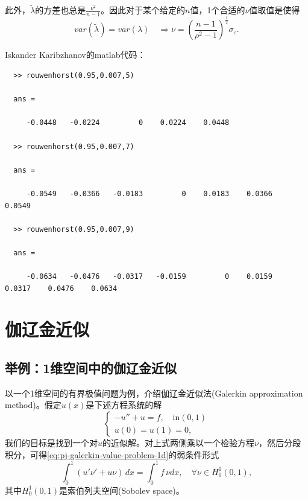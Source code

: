 \begin{subappendices}
此外，$\tilde{\lambda}$的方差也总是$\frac{\nu^2}{n-1}$。因此对于某个给定的$n$值，1个合适的$\nu$值取值是使得\begin{equation*}
var \left( \tilde{\lambda} \right) = var \left( \lambda \right) \quad \Rightarrow \nu = \left( \frac{n-1}{\rho^2 - 1} \right)^{\frac{1}{2}} \sigma_{\varepsilon}.
\end{equation*}

Iskander Karibzhanov的matlab代码：

\begin{verbatim}
  >> rouwenhorst(0.95,0.007,5)

  ans =

     -0.0448   -0.0224         0    0.0224    0.0448

  >> rouwenhorst(0.95,0.007,7)

  ans =

     -0.0549   -0.0366   -0.0183         0    0.0183    0.0366    0.0549

  >> rouwenhorst(0.95,0.007,9)

  ans =

     -0.0634   -0.0476   -0.0317   -0.0159         0    0.0159    0.0317    0.0476    0.0634
\end{verbatim}


\section{伽辽金近似}
\label{sec:pj-galerkin-approximation}

\subsection{举例：1维空间中的伽辽金近似}
\label{sec:pj-galerkin-1d-example}
以一个1维空间的有界极值问题为例，介绍伽辽金近似法(Galerkin approximation method)。假定$u(x)$是下述方程系统的解
\begin{equation}
  \label{eq:pj-galerkin-value-problem-1d}
  \begin{cases}
    -u'' + u = f, \quad \text{in} (0,1) \\
    u(0)=u(1)=0,
  \end{cases}
\end{equation}
我们的目标是找到一个对$u$的近似解。对上式两侧乘以一个检验方程$\nu$，然后分段积分，可得\eqref{eq:pj-galerkin-value-problem-1d}的弱条件形式
\begin{equation}
  \label{eq:pj-galerkin-value-problem-integral}
  \int_{0}^{1} \left( u' \nu' + u \nu \right) \, dx = \int_{0}^{1} f \, \nu dx, \quad \forall \nu \in H_{0}^1(0,1),
\end{equation}
 其中$ H_{0}^{1}(0,1) $是索伯列夫空间(Sobolev space)。


\end{subappendices}
